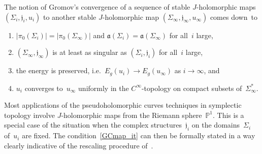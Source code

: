 \documentclass[11pt]{article}
\numberwithin{equation}{section}
\theoremstyle{definition}
\def\sf#1{\textsf{#1}}
\def\lra{\longrightarrow}
\def\fa{\mathfrak a}
\def\fj{\mathfrak j}
\def\P{\mathbb{P}}
\def\Si{\Sigma}
\def\i{\infty}
\begin{document}
\noindent
The notion of \sf{Gromov's convergence} of a sequence 
of stable $J$-holomorphic maps $(\Si_i,\fj_i,u_i)$
to another stable $J$-holomorphic map $(\Si_{\i},\fj_{\i},u_{\i})$ comes down~to
\begin{enumerate}[label=(GC\arabic*),leftmargin=*]

\item $|\pi_0(\Si_i)|\!=\!|\pi_0(\Si_{\i})|$ and $\fa(\Si_i)\!=\!\fa(\Si_{\i})$
for all~$i$ large,

\item $(\Si_{\i},\fj_{\i})$ is at least as singular as $(\Si_i,\fj_i)$
for all~$i$ large,

\item\label{GCenergy_it} 
the energy is preserved, i.e.~$E_g(u_i)\!\lra\!E_g(u_{\i})$ as $i\!\lra\!\i$, and

\item\label{GCmap_it} 
$u_i$ converges to~$u_{\i}$ uniformly in the $C^{\i}$-topology on compact 
subsets of~$\Si_{\i}^*$.

\end{enumerate}
Most applications of the pseudoholomorphic curves techniques in symplectic topology
involve \hbox{$J$-holomorphic} maps from the Riemann sphere~$\P^1$.
This is a special case of the situation when the complex structures~$\fj_i$ on
the domains~$\Si_i$ of~$u_i$ are fixed.
The condition~\ref{GCmap_it} can then be formally stated in a way  
clearly indicative of the rescaling procedure of~\cite{Gr}.
\end{document}
